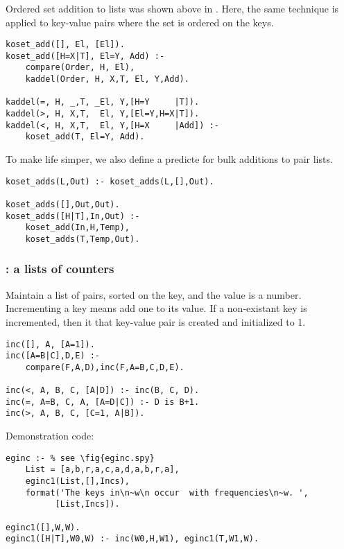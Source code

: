 \subsubsection{ 
}
Ordered set addition to lists was shown above in . Here,
the same technique is applied to key-value pairs where the set is ordered
on the keys.

\begin{Verbatim}
koset_add([], El, [El]). 
koset_add([H=X|T], El=Y, Add) :-
    compare(Order, H, El),
    kaddel(Order, H, X,T, El, Y,Add).

kaddel(=, H, _,T, _El, Y,[H=Y     |T]). 
kaddel(>, H, X,T,  El, Y,[El=Y,H=X|T]).
kaddel(<, H, X,T,  El, Y,[H=X     |Add]) :-
	koset_add(T, El=Y, Add).
\end{Verbatim}
To make life simper, we also define a predicte for bulk additions
to pair lists.
\begin{Verbatim}
koset_adds(L,Out) :- koset_adds(L,[],Out).

koset_adds([],Out,Out).
koset_adds([H|T],In,Out) :- 
    koset_add(In,H,Temp), 
    koset_adds(T,Temp,Out).
\end{Verbatim}
\subsubsection{ : a lists of counters 
}
\label{sec:inc/3}
Maintain a list of pairs, sorted on the key, and the value
is a number. Incrementing a key 
means add one to its value. If a non-existant key is incremented,
then it that key-value pair is created and initialized to 1.
\begin{Verbatim}
inc([], A, [A=1]).
inc([A=B|C],D,E) :- 
    compare(F,A,D),inc(F,A=B,C,D,E).

inc(<, A, B, C, [A|D]) :- inc(B, C, D).
inc(=, A=B, C, A, [A=D|C]) :- D is B+1.
inc(>, A, B, C, [C=1, A|B]).
\end{Verbatim}
 Demonstration code:
\begin{Verbatim}
eginc :- % see \fig{eginc.spy}
    List = [a,b,r,a,c,a,d,a,b,r,a],
    eginc1(List,[],Incs),
    format('The keys in\n~w\n occur  with frequencies\n~w. ',
          [List,Incs]).
    
eginc1([],W,W).
eginc1([H|T],W0,W) :- inc(W0,H,W1), eginc1(T,W1,W).
\end{Verbatim}
